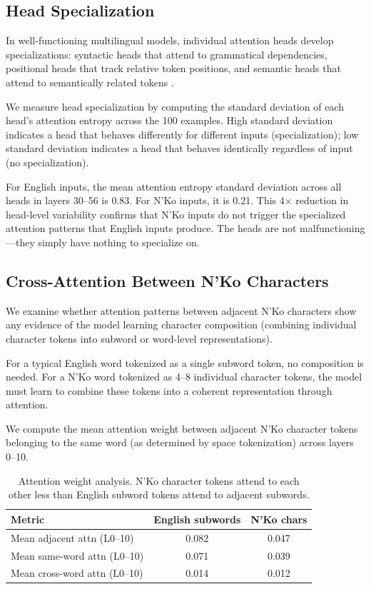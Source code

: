 \documentclass[11pt]{article}
\begin{document}
\subsection{Head Specialization}

In well-functioning multilingual models, individual attention heads develop specializations: syntactic heads that attend to grammatical dependencies, positional heads that track relative token positions, and semantic heads that attend to semantically related tokens \cite{clark2019attention}.

We measure head specialization by computing the standard deviation of each head's attention entropy across the 100 examples.
High standard deviation indicates a head that behaves differently for different inputs (specialization); low standard deviation indicates a head that behaves identically regardless of input (no specialization).

For English inputs, the mean attention entropy standard deviation across all heads in layers 30--56 is 0.83.
For N'Ko inputs, it is 0.21.
This 4$\times$ reduction in head-level variability confirms that N'Ko inputs do not trigger the specialized attention patterns that English inputs produce.
The heads are not malfunctioning---they simply have nothing to specialize on.

\subsection{Cross-Attention Between N'Ko Characters}

We examine whether attention patterns between adjacent N'Ko characters show any evidence of the model learning character composition (combining individual character tokens into subword or word-level representations).

For a typical English word tokenized as a single subword token, no composition is needed.
For a N'Ko word tokenized as 4--8 individual character tokens, the model must learn to combine these tokens into a coherent representation through attention.

We compute the mean attention weight between adjacent N'Ko character tokens belonging to the same word (as determined by space tokenization) across layers 0--10.

\begin{table}[t]
\centering
\small
\begin{tabular}{lcc}
\toprule
\textbf{Metric} & \textbf{English subwords} & \textbf{N'Ko chars} \\
\midrule
Mean adjacent attn (L0--10) & 0.082 & 0.047 \\
Mean same-word attn (L0--10) & 0.071 & 0.039 \\
Mean cross-word attn (L0--10) & 0.014 & 0.012 \\
\bottomrule
\end{tabular}
\caption{Attention weight analysis. N'Ko character tokens attend to each other less than English subword tokens attend to adjacent subwords.}
\label{tab:cross-attention}
\end{table}
\end{document}
